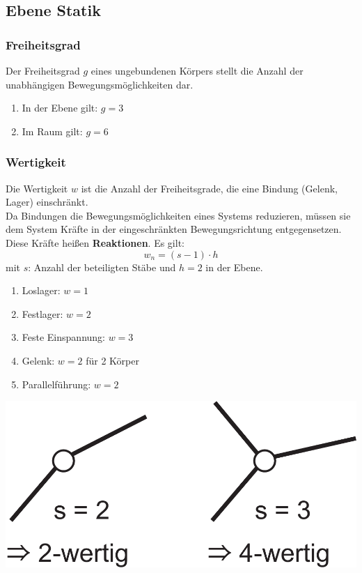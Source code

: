 \documentclass[a4paper,twocolumn,10pt]{article}
\begin{document}
\subsection{Ebene Statik}

\subsubsection{Freiheitsgrad}
Der Freiheitsgrad $g$ eines ungebundenen Körpers stellt die Anzahl der unabhängigen Bewegungsmöglichkeiten dar.
\begin{enumerate}
\item In der Ebene gilt: $g=3$
\item Im Raum gilt: $g=6$
\end{enumerate}

\subsubsection{Wertigkeit}
Die Wertigkeit $w$ ist die Anzahl der Freiheitsgrade, die eine Bindung (Gelenk, Lager) einschränkt.\\
Da Bindungen die Bewegungsmöglichkeiten eines Systems reduzieren, müssen sie dem System Kräfte in der eingeschränkten Bewegungsrichtung entgegensetzen. Diese Kräfte heißen \textbf{Reaktionen}. Es gilt:
\begin{equation*}
w_n=(s-1)\cdot h
\end{equation*}
mit $s$: Anzahl der beteiligten Stäbe und $h=2$ in der Ebene.
\begin{enumerate}[label=$\bullet$]
\item Loslager: $w=1$
\item Festlager: $w=2$
\item Feste Einspannung: $w=3$
\item Gelenk: $w=2$ für 2 Körper
\item Parallelführung: $w=2$
\end{enumerate}
\begin{center}
\includegraphics[width=0.6\columnwidth]{Grafiken/Bindungen_Wertigkeit}
\end{center}
\end{document}
